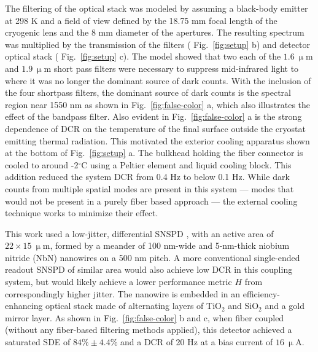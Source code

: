 \documentclass[11pt]{caltech_thesis} %
\begin{document}
The filtering of the optical stack was modeled by assuming a black-body emitter at 298 K and a field of view defined by the 18.75 mm focal length of the cryogenic lens and the 8 mm diameter of the apertures. The resulting spectrum was multiplied by the transmission of the filters ( Fig.~\ref{fig:setup} b) and detector optical stack ( Fig.~\ref{fig:setup} c). The model showed that two each of the $1.6 \ \mathrm{\upmu m}$ and $1.9 \ \mathrm{\upmu m}$ short pass filters were necessary to suppress mid-infrared light to where it was no longer the dominant source of dark counts. With the inclusion of the four shortpass filters, the dominant source of dark counts is the spectral region near 1550 nm as shown in Fig.~\ref{fig:false-color} a, which also illustrates the effect of the bandpass filter. Also evident in Fig.~\ref{fig:false-color} a is the strong dependence of DCR on the temperature of the final surface outside the cryostat emitting thermal radiation. This motivated the exterior cooling apparatus shown at the bottom of Fig.~\ref{fig:setup} a. The bulkhead holding the fiber connector is cooled to around -2$^\circ$C using a Peltier element and liquid cooling block. This addition reduced the system DCR from 0.4 Hz to below 0.1 Hz. While dark counts from multiple spatial modes are present in this system --- modes that would not be present in a purely fiber based approach --- the external cooling technique works to minimize their effect.

This work used a low-jitter, differential SNSPD \autocite{Colangelo2023}, with an active area of $22 \times 15 \ \mathrm{\upmu m}$, formed by a meander of 100 nm-wide and 5-nm-thick niobium nitride (NbN) nanowires on a 500 nm pitch. A more conventional single-ended readout SNSPD of similar area would also achieve low DCR in this coupling system, but would likely achieve a lower performance metric $H$ from correspondingly higher jitter. The nanowire is embedded in an efficiency-enhancing optical stack made of alternating layers of TiO$_2$ and SiO$_2$ and a gold mirror layer. As shown in Fig.~\ref{fig:false-color} b and c, when fiber coupled (without any fiber-based filtering methods applied), this detector achieved a saturated SDE of $84\% \pm 4.4 \%$ and a DCR of 20 Hz at a bias current of $16\ \mathrm{\upmu A}$.
\end{document}

